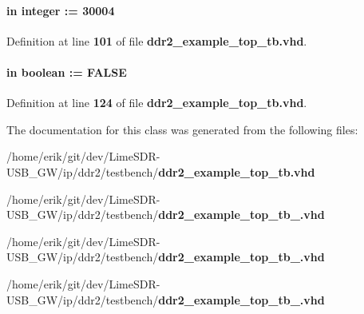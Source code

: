 \paragraph[{T\+I\+N\+I\+T\+\_\+\+C\+L\+O\+C\+KS}]{ {\bfseries \textcolor{keywordflow}{in}\textcolor{vhdlchar}{ }} {\bfseries \textcolor{comment}{integer}\textcolor{vhdlchar}{ }\textcolor{vhdlchar}{ }\textcolor{vhdlchar}{\+:}\textcolor{vhdlchar}{=}\textcolor{vhdlchar}{ }\textcolor{vhdlchar}{ } \textcolor{vhdldigit}{30004} \textcolor{vhdlchar}{ }} \hspace{0.3cm}{\ttfamily [Generic]}}\label{classddr2__example__top__tb_a554ab0af37189c3b3948cd7fe4393799}


Definition at line {\bf 101} of file {\bf ddr2\+\_\+example\+\_\+top\+\_\+tb.\+vhd}.

\paragraph[{U\+S\+E\+\_\+\+G\+E\+N\+E\+R\+I\+C\+\_\+\+M\+E\+M\+O\+R\+Y\+\_\+\+M\+O\+D\+EL}]{ {\bfseries \textcolor{keywordflow}{in}\textcolor{vhdlchar}{ }} {\bfseries \textcolor{comment}{boolean}\textcolor{vhdlchar}{ }\textcolor{vhdlchar}{ }\textcolor{vhdlchar}{\+:}\textcolor{vhdlchar}{=}\textcolor{vhdlchar}{ }\textcolor{vhdlchar}{ }\textcolor{vhdlchar}{ }\textcolor{vhdlchar}{ }\textcolor{vhdlchar}{F\+A\+L\+SE}\textcolor{vhdlchar}{ }} \hspace{0.3cm}{\ttfamily [Generic]}}\label{classddr2__example__top__tb_a9ae6d35e66382976c7ba220b9be4c6fc}


Definition at line {\bf 124} of file {\bf ddr2\+\_\+example\+\_\+top\+\_\+tb.\+vhd}.



The documentation for this class was generated from the following files\+:\begin{DoxyCompactItemize}
\item 
/home/erik/git/dev/\+Lime\+S\+D\+R-\/\+U\+S\+B\+\_\+\+G\+W/ip/ddr2/testbench/{\bf ddr2\+\_\+example\+\_\+top\+\_\+tb.\+vhd}\item 
/home/erik/git/dev/\+Lime\+S\+D\+R-\/\+U\+S\+B\+\_\+\+G\+W/ip/ddr2/testbench/{\bf ddr2\+\_\+example\+\_\+top\+\_\+tb\+\_.\+vhd}\item 
/home/erik/git/dev/\+Lime\+S\+D\+R-\/\+U\+S\+B\+\_\+\+G\+W/ip/ddr2/testbench/{\bf ddr2\+\_\+example\+\_\+top\+\_\+tb\+\_.\+vhd}\item 
/home/erik/git/dev/\+Lime\+S\+D\+R-\/\+U\+S\+B\+\_\+\+G\+W/ip/ddr2/testbench/{\bf ddr2\+\_\+example\+\_\+top\+\_\+tb\+\_.\+vhd}\end{DoxyCompactItemize}
